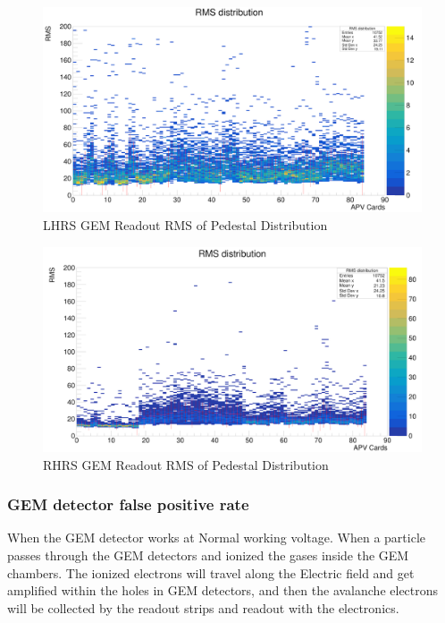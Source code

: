 \begin{figure}[!htbp]
    \centering
    \includegraphics[width=\textwidth]{images/chap5/LHRS_pedestal.png}
    \caption{LHRS GEM Readout RMS of Pedestal Distribution}
    \label{fig:lhrs_pedestal_distribution}
\end{figure}

\begin{figure}[!htbp]
    \centering
    \includegraphics[width=\textwidth]{images/chap5/rhrs_pedestal.png}
    \caption{RHRS GEM Readout RMS of Pedestal Distribution}
    \label{fig:rhrs_pedestal_distribution}
\end{figure}


\subsubsection{GEM detector false positive rate}

When the GEM detector works at Normal working voltage. When a particle passes through  
the GEM detectors and ionized the gases inside the GEM chambers. The ionized electrons 
will travel along the Electric field and get amplified within the holes in GEM detectors, 
and then the avalanche electrons will be collected by the readout strips and readout with the electronics. 

